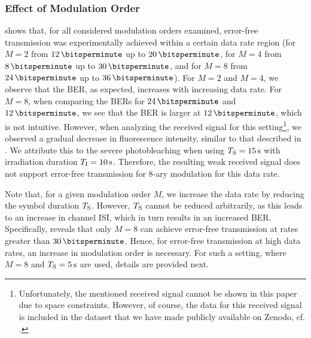 \subsubsection{Effect of Modulation Order}\label{sssec:effect_modulation_order}
\scaleSubsubsectionBelow
%
 shows that, for all considered modulation orders examined, error-free transmission was experimentally achieved within a certain data rate region (for $M=2$ from $\SI{12}{\bitsperminute}$ up to $\SI{20}{\bitsperminute}$, for $M=4$ from $\SI{8}{\bitsperminute}$ up to $\SI{30}{\bitsperminute}$, and for $M=8$ from $\SI{24}{\bitsperminute}$ up to $\SI{36}{\bitsperminute}$).
For $M=2$ and $M=4$, we observe that the \ac{BER}, as expected, increases with increasing data rate. For $M=8$, when comparing the \acp{BER} for $\SI{24}{\bitsperminute}$ and $\SI{12}{\bitsperminute}$, we see that the \ac{BER} is larger at $\SI{12}{\bitsperminute}$, which is not intuitive. However, when analyzing the received signal for this setting\footnote{Unfortunately, the mentioned received signal cannot be shown in this paper due to space constraints. However, of course, the data for this received signal is included in the dataset that we have made publicly available on Zenodo, cf. .}, we observed a gradual decrease in fluorescence intensity, similar to that described in . We attribute this to the severe photobleaching when using $T_{\mathrm{S}} = \SI{15}{\text{s}}$ with irradiation duration $T_{\mathrm{I}} = \SI{10}{\text{s}}$. Therefore, the resulting weak received signal does not support error-free transmission for 8-ary modulation for this data rate.

Note that, for a given modulation order $M$, we increase the data rate by reducing the symbol duration $T_{\mathrm{S}}$. However, $T_{\mathrm{S}}$ cannot be reduced arbitrarily, as this leads to an increase in channel \ac{ISI}, which in turn results in an increased \ac{BER}. Specifically,  reveals that only $M=8$ can achieve error-free transmission at rates greater than $\SI{30}{\bitsperminute}$. Hence, for error-free transmission at high data rates, an increase in modulation order is necessary. For such a setting, where $M=8$ and $\Ts = \SI{5}{\s}$ are used, details are provided next.

